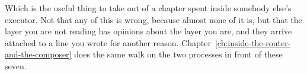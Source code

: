 \medskip
Which is the useful thing to take out of a chapter spent inside somebody else's
executor. Not that any of this is wrong, because almost none of it is, but that
the layer you are not reading has opinions about the layer you are, and they
arrive attached to a line you wrote for another reason.
Chapter~\ref{ch:inside-the-router-and-the-composer} does the same walk on the
two processes in front of these seven.

%
